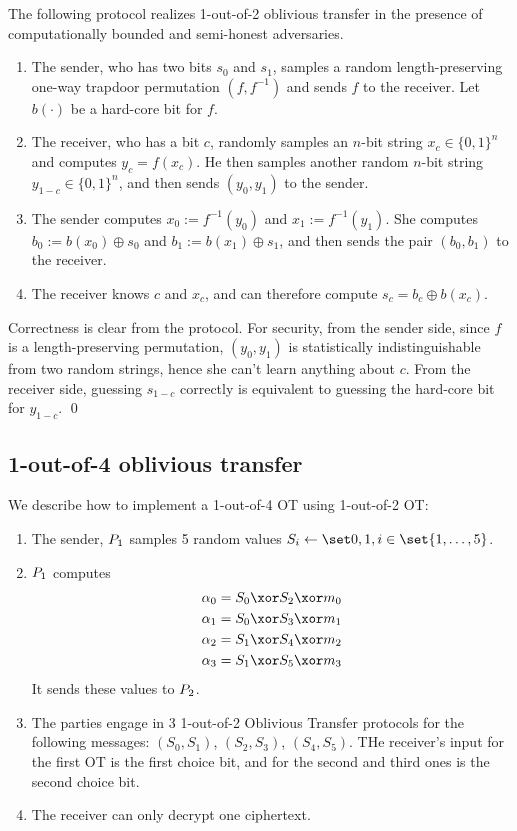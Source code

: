 \documentclass[12pt]{tufte-book}
\begin{document}
\begin{theorem}
The following protocol realizes 1-out-of-2 oblivious transfer in the presence of computationally bounded and semi-honest adversaries. 
\begin{enumerate}
\item The sender, who has two bits $s_0$ and $s_1$, samples a random length-preserving one-way trapdoor permutation $(f, f^{-1})$ and sends $f$ to the receiver.  Let $b(\cdot)$ be a hard-core bit for $f$.
\item The receiver, who has a bit $c$, randomly samples an $n$-bit string $x_c \in \{0,1\}^n$ and computes $y_c = f(x_c)$. He then samples another random $n$-bit string $y_{1-c} \in \{0,1\}^n$, and then sends $(y_0, y_1)$ to the sender.
\item The sender computes $x_0 := f^{-1}(y_0)$ and $x_1 := f^{-1}(y_1)$. She computes $b_0 := b(x_0) \oplus s_0$ and $b_1 := b(x_1) \oplus s_1$, and then sends the pair $(b_0, b_1)$ to the receiver.
\item The receiver knows $c$ and $x_c$, and can therefore compute $s_c = b_c \oplus b(x_c)$. 
\end{enumerate}
\end{theorem}
\proof
Correctness is clear from the protocol.	
For security, from the sender side, since $f$ is a length-preserving permutation, $(y_0, y_1)$ is statistically indistinguishable from two random strings, hence she can't learn anything about $c$.
From the receiver side, guessing $s_{1-c}$ correctly is equivalent to guessing the hard-core bit for $y_{1-c}$.
\qed


\subsection{1-out-of-4 oblivious transfer}
  We describe how to implement a 1-out-of-4 OT using 1-out-of-2 OT:\@
  \begin{enumerate}
    \item
      The sender, $P_1$ samples 5 random values $S_i \gets \bits, i \in \set{1,\dotsc, 5}$.
    \item
      $P_1$ computes
      \begin{align*}
        \alpha_0 &= S_0 \xor S_2 \xor m_0\\
        \alpha_1 &= S_0 \xor S_3 \xor m_1\\
        \alpha_2 &= S_1 \xor S_4 \xor m_2\\
        \alpha_3 &= S_1 \xor S_5 \xor m_3
      \end{align*}
      It sends these values to $P_2$.
    \item
      The parties engage in 3 1-out-of-2 Oblivious Transfer protocols for the following
      messages: $(S_0, S_1)$, $(S_2, S_3)$, $(S_4, S_5)$. THe receiver's input for
      the first OT is the first choice bit, and for the second and third ones is
      the second choice bit.
    \item
      The receiver can only decrypt one ciphertext.
  \end{enumerate}
\end{document}
